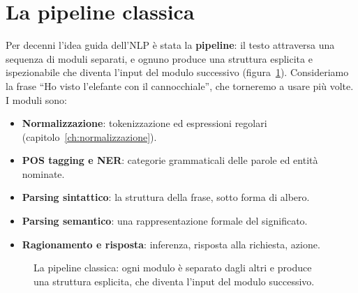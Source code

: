 \section{La pipeline classica}\label{sec:pipeline}
Per decenni l'idea guida dell'NLP è stata la \textbf{pipeline}: il testo attraversa una sequenza di moduli separati, e ognuno produce una struttura esplicita e ispezionabile che diventa l'input del modulo successivo (figura~\ref{fig:pipeline}). Consideriamo la frase \enquote{Ho visto l'elefante con il cannocchiale}, che torneremo a usare più volte. I moduli sono:
\begin{itemize}
    \item \textbf{Normalizzazione}: tokenizzazione ed espressioni regolari (capitolo~\ref{ch:normalizzazione}).
    \item \textbf{POS tagging e NER}: categorie grammaticali delle parole ed entità nominate.
    \item \textbf{Parsing sintattico}: la struttura della frase, sotto forma di albero.
    \item \textbf{Parsing semantico}: una rappresentazione formale del significato.
    \item \textbf{Ragionamento e risposta}: inferenza, risposta alla richiesta, azione.
\end{itemize}

\begin{figure}[htbp]
\centering
{}
\caption{La pipeline classica: ogni modulo è separato dagli altri e produce una struttura esplicita, che diventa l'input del modulo successivo.}
\label{fig:pipeline}
\end{figure}

